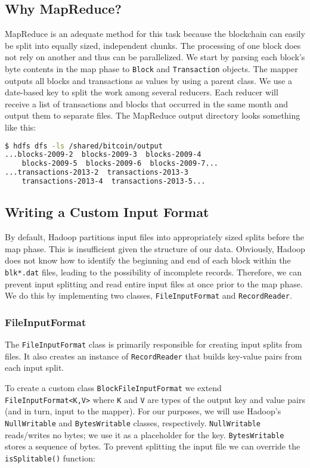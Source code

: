 \documentclass[9pt,twocolumn,twoside]{idsi}
\begin{document}
\subsection{Why MapReduce?}
MapReduce is an adequate method for this task because the blockchain can easily be split into equally sized, independent chunks. The processing of one block does not rely on another and thus can be parallelized. We start by parsing each block's byte contents in the map phase to \lstinline{Block} and \lstinline{Transaction} objects. The mapper outputs all blocks and transactions as values by using a parent  class. We use a date-based key to split the work among several reducers. Each reducer will receive a list of transactions and blocks that occurred in the same month and output them to separate files. The MapReduce output directory looks something like this:

\begin{lstlisting}[language=bash]
 $ hdfs dfs -ls /shared/bitcoin/output
...blocks-2009-2  blocks-2009-3  blocks-2009-4
    blocks-2009-5  blocks-2009-6  blocks-2009-7...
...transactions-2013-2  transactions-2013-3
    transactions-2013-4  transactions-2013-5...
\end{lstlisting}

\subsection{Writing a Custom Input Format}
By default, Hadoop partitions input files into appropriately sized splits before the map phase. This is insufficient given the structure of our data. Obviously, Hadoop does not know how to identify the beginning and end of each block within the \lstinline{blk*.dat} files, leading to the possibility of incomplete records. Therefore, we can prevent input splitting and read entire input files at once prior to the map phase. We do this by implementing two classes, \lstinline{FileInputFormat} and \lstinline{RecordReader}.

\subsubsection{FileInputFormat}
The \lstinline{FileInputFormat} class is primarily responsible for creating input splits from files. It also creates an instance of \lstinline{RecordReader} that builds key-value pairs from each input split.

To create a custom class \lstinline{BlockFileInputFormat} we extend \lstinline{FileInputFormat<K,V>} where \lstinline{K} and \lstinline{V} are types of the output key and value pairs (and in turn, input to the mapper). For our purposes, we will use Hadoop's \lstinline{NullWritable} and \lstinline{BytesWritable} classes, respectively. \lstinline{NullWritable} reads/writes no bytes; we use it as a placeholder for the key. \lstinline{BytesWritable} stores a sequence of bytes. To prevent splitting the input file we can override the \lstinline{isSplitable()} function:
\end{document}
